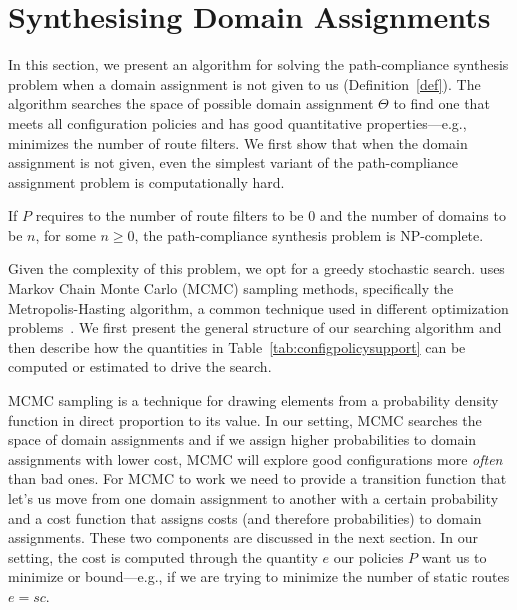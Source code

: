 \section{Synthesising Domain Assignments}
\label{sec:synth-dom-ass}

In this section, we present an algorithm for 
solving the path-compliance synthesis problem when a domain assignment is not given to us (Definition~\ref{def}).
The algorithm searches the space of possible domain assignment $\Theta$ to find
one that meets all configuration policies and has good quantitative properties---e.g., minimizes
the number of route filters.
%
We first show that when the domain assignment is not given,
even the simplest variant of the path-compliance assignment problem
is computationally hard.
\begin{theorem}
If $P$ requires to the number of route filters to be 0
and the number of domains to be $n$, for some $n\geq 0$,
the path-compliance synthesis problem is NP-complete.
\end{theorem}

Given the complexity of this problem, we opt for a greedy
stochastic search.
\name uses Markov
Chain Monte Carlo (MCMC) sampling methods, specifically the Metropolis-Hasting
algorithm, a common technique used in different optimization 
problems~\cite{stoke}. 
We first present the general structure of our searching algorithm and 
then describe how the quantities in Table~\ref{tab:configpolicysupport} can be computed
or estimated to drive the search.

MCMC sampling is a technique for 
drawing elements from a
probability density function in direct proportion to its value.
In our setting, MCMC searches the space of domain assignments and
if we assign higher probabilities to domain assignments with lower cost, MCMC will explore
good configurations more \emph{often} than bad ones.
For MCMC to work we need to provide a transition function that let's us move from one domain assignment
to another with a certain probability and a cost function that assigns costs (and therefore probabilities) to
domain assignments. These two components are discussed in the next section.
In our setting, the cost is computed through the quantity $e$ our policies $P$ want us to minimize or bound---e.g.,
if we are trying to minimize the number of static routes $e=sc$.

